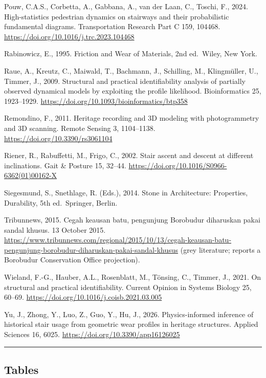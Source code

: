 \documentclass[
]{article}
\begin{document}
Pouw, C.A.S., Corbetta, A., Gabbana, A., van der Laan, C., Toschi, F.,
2024. High-statistics pedestrian dynamics on stairways and their
probabilistic fundamental diagrams. Transportation Research Part C 159,
104468. \url{https://doi.org/10.1016/j.trc.2023.104468}

Rabinowicz, E., 1995. Friction and Wear of Materials, 2nd ed.~Wiley, New
York.

Raue, A., Kreutz, C., Maiwald, T., Bachmann, J., Schilling, M.,
Klingmüller, U., Timmer, J., 2009. Structural and practical
identifiability analysis of partially observed dynamical models by
exploiting the profile likelihood. Bioinformatics 25, 1923--1929.
\url{https://doi.org/10.1093/bioinformatics/btp358}

Remondino, F., 2011. Heritage recording and 3D modeling with
photogrammetry and 3D scanning. Remote Sensing 3, 1104--1138.
\url{https://doi.org/10.3390/rs3061104}

Riener, R., Rabuffetti, M., Frigo, C., 2002. Stair ascent and descent at
different inclinations. Gait \& Posture 15, 32--44.
\url{https://doi.org/10.1016/S0966-6362(01)00162-X}

Siegesmund, S., Snethlage, R. (Eds.), 2014. Stone in Architecture:
Properties, Durability, 5th ed.~Springer, Berlin.

Tribunnews, 2015. Cegah keausan batu, pengunjung Borobudur diharuskan
pakai sandal khusus. 13 October 2015.
\url{https://www.tribunnews.com/regional/2015/10/13/cegah-keausan-batu-pengunjung-borobudur-diharuskan-pakai-sandal-khusus}
(grey literature; reports a Borobudur Conservation Office projection).

Wieland, F.-G., Hauber, A.L., Rosenblatt, M., Tönsing, C., Timmer, J.,
2021. On structural and practical identifiability. Current Opinion in
Systems Biology 25, 60--69.
\url{https://doi.org/10.1016/j.coisb.2021.03.005}

Yu, J., Zhong, Y., Luo, Z., Guo, Y., Hu, J., 2026. Physics-informed
inference of historical stair usage from geometric wear profiles in
heritage structures. Applied Sciences 16, 6025.
\url{https://doi.org/10.3390/app16126025}

\begin{center}\rule{0.5\linewidth}{0.5pt}\end{center}

\subsection{Tables}\label{tables}
\end{document}
